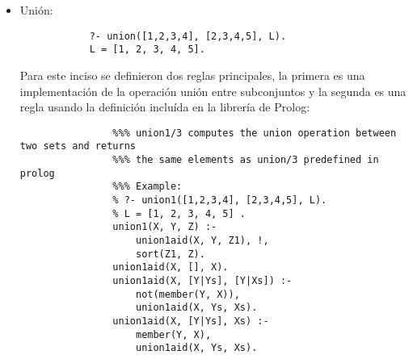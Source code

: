 \begin{enumerate}
\begin{itemize}
        \item Unión:
        \begin{verbatim}
            ?- union([1,2,3,4], [2,3,4,5], L).
            L = [1, 2, 3, 4, 5].
        \end{verbatim}
        \begin{solution}
            Para este inciso se definieron dos reglas principales, la primera es una implementación de la operación unión entre subconjuntos y la segunda es una regla usando la definición incluída en la librería de Prolog:
            \begin{verbatim}
                %%% union1/3 computes the union operation between two sets and returns
                %%% the same elements as union/3 predefined in prolog
                %%% Example:
                % ?- union1([1,2,3,4], [2,3,4,5], L).
                % L = [1, 2, 3, 4, 5] .
                union1(X, Y, Z) :-
                    union1aid(X, Y, Z1), !,
                    sort(Z1, Z).
                union1aid(X, [], X).
                union1aid(X, [Y|Ys], [Y|Xs]) :-
                    not(member(Y, X)),
                    union1aid(X, Ys, Xs).
                union1aid(X, [Y|Ys], Xs) :-
                    member(Y, X),
                    union1aid(X, Ys, Xs).


\end{verbatim}
\end{solution}
\end{itemize}
\end{enumerate}
